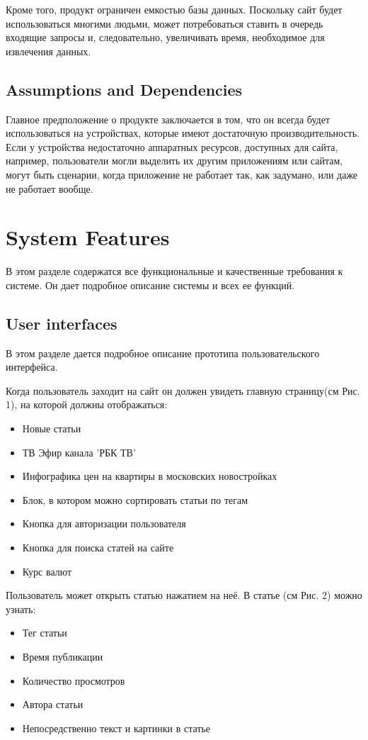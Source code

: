 \documentclass{scrreprt}
\begin{document}
Кроме того, продукт ограничен емкостью базы данных. Поскольку сайт будет использоваться многими людьми, может потребоваться ставить в очередь входящие запросы и, следовательно, увеличивать время, необходимое для извлечения данных.

\section{Assumptions and Dependencies}

Главное предположение о продукте заключается в том, что он всегда будет использоваться на устройствах, которые имеют достаточную
производительность. Если у устройства недостаточно аппаратных ресурсов, доступных для сайта, например, пользователи могли выделить их другим приложениям или сайтам, могут быть сценарии, когда приложение
не работает так, как задумано, или даже не работает вообще.

\chapter{System Features}
В этом разделе содержатся все функциональные и качественные требования к системе. Он дает подробное описание системы и всех ее функций.
\section{User interfaces}
 В этом разделе дается подробное описание прототипа пользовательского интерфейса.
 
 Когда пользователь заходит на сайт он должен увидеть главную страницу(см Рис. 1), на которой должны отображаться:
 \begin{itemize}
 	\item Новые статьи
 	\item ТВ Эфир канала 'РБК ТВ'
 	\item Инфографика цен на квартиры в московских новостройках
 	\item Блок, в котором можно сортировать статьи по тегам
 	\item Кнопка для авторизации пользователя
 	\item Кнопка для поиска статей на сайте
 	\item Курс валют
 \end{itemize}
 
 Пользователь может открыть статью нажатием на неё. В статье (см Рис. 2) можно узнать:
 \begin{itemize}
 	\item Тег статьи
 	\item Время публикации
 	\item Количество просмотров
 	\item Автора статьи
 	\item Непосредственно текст и картинки в статье
 \end{itemize}
 
\end{document}
